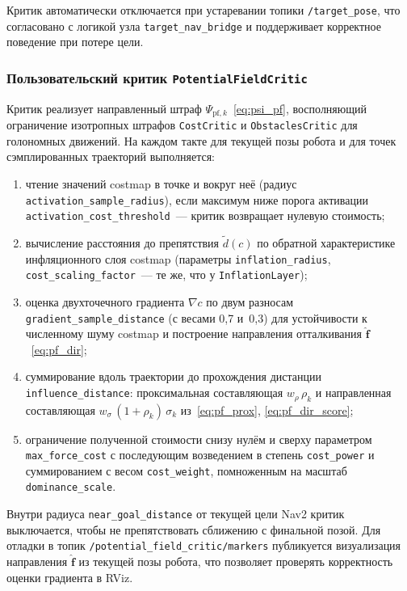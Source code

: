 Критик автоматически отключается при устаревании топики
\texttt{/target\_pose}, что согласовано с логикой узла
\texttt{target\_nav\_bridge} и поддерживает корректное поведение при
потере цели.

\subsubsection{Пользовательский критик \texttt{PotentialFieldCritic}}

Критик реализует направленный штраф
$\Psi_{\text{pf},k}$~\eqref{eq:psi_pf}, восполняющий ограничение
изотропных штрафов \texttt{CostCritic} и \texttt{ObstaclesCritic} для
голономных движений. На каждом такте для текущей позы робота и для
точек сэмплированных траекторий выполняется:
\begin{enumerate}
    \item чтение значений costmap в точке и вокруг неё (радиус
          \texttt{activation\_sample\_radius}), если максимум ниже
          порога активации \texttt{activation\_cost\_threshold}~--- критик
          возвращает нулевую стоимость;
    \item вычисление расстояния до препятствия $\tilde{d}(c)$ по
          обратной характеристике инфляционного слоя costmap
          (параметры \texttt{inflation\_radius},
          \texttt{cost\_scaling\_factor}~--- те же, что у
          \texttt{InflationLayer});
    \item оценка двухточечного градиента $\nabla c$ по двум
          разносам \texttt{gradient\_sample\_distance} (с весами 0{,}7
          и~0{,}3) для устойчивости к численному шуму costmap и
          построение направления отталкивания
          $\hat{\mathbf{f}}$~\eqref{eq:pf_dir};
    \item суммирование вдоль траектории до прохождения дистанции
          \texttt{influence\_distance}: проксимальная составляющая
          $w_{\rho}\,\rho_k$ и направленная составляющая
          $w_{\sigma}\,(1+\rho_k)\,\sigma_k$ из~\eqref{eq:pf_prox},
          \eqref{eq:pf_dir_score};
    \item ограничение полученной стоимости снизу нулём и сверху
          параметром \texttt{max\_force\_cost} с последующим
          возведением в степень \texttt{cost\_power} и суммированием
          с весом \texttt{cost\_weight}, помноженным на масштаб
          \texttt{dominance\_scale}.
\end{enumerate}

Внутри радиуса \texttt{near\_goal\_distance} от текущей цели Nav2
критик выключается, чтобы не препятствовать сближению с финальной
позой. Для отладки в топик \texttt{/potential\_field\_critic/markers}
публикуется визуализация направления $\hat{\mathbf{f}}$ из текущей
позы робота, что позволяет проверять корректность оценки градиента в
RViz.

